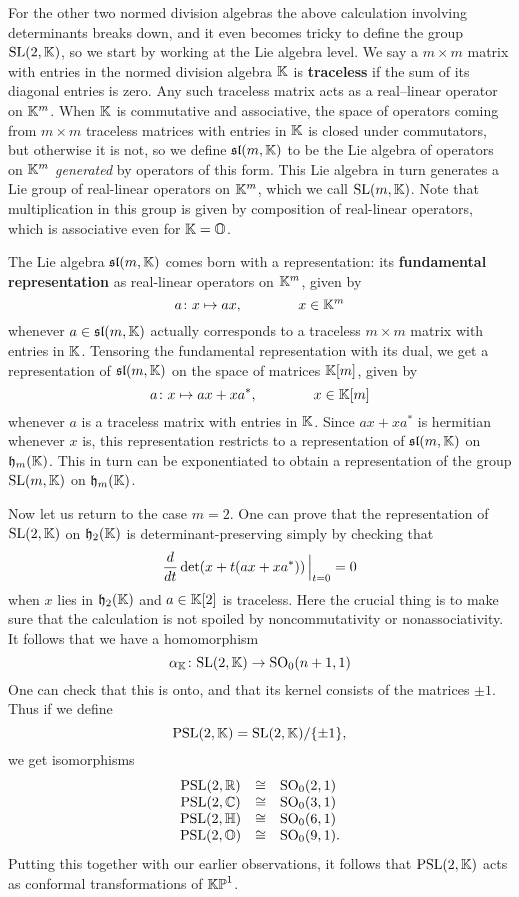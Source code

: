 For the other two normed division algebras the above calculation
involving determinants breaks down, and it even becomes tricky to define
the group ${\rm SL}(2,{\mathbb K})$, so we start by working at the Lie algebra level.
We say a $m \times m$ matrix with entries in the normed division algebra
${\mathbb K}$ is {\bf traceless} if the sum of its diagonal entries is zero.  Any
such traceless matrix acts as a real--linear operator on ${\mathbb K}^m$.  When
${\mathbb K}$ is commutative and associative, the space of operators coming from
$m \times m$ traceless matrices with entries in ${\mathbb K}$ is closed under
commutators, but otherwise it is not, so we define ${\mathfrak {sl}}(m,{\mathbb K})$ to be the
Lie algebra of operators on ${\mathbb K}^m$ {\it generated} by operators of this
form.  This Lie algebra in turn generates a Lie group of real-linear
operators on ${\mathbb K}^m$, which we call ${\rm SL}(m,{\mathbb K})$.  Note that
multiplication in this group is given by composition of real-linear
operators, which is associative even for ${\mathbb K} = {\mathbb O}$.
 
The Lie algebra ${\mathfrak {sl}}(m,{\mathbb K})$ comes born with a representation:  
its {\bf fundamental representation} as real-linear operators on ${\mathbb K}^m$,  
given by 
\[   a \colon x \mapsto ax ,           \qquad \qquad x \in {\mathbb K}^m \] 
whenever $a \in {\mathfrak {sl}}(m,{\mathbb K})$ actually corresponds to a traceless $m \times 
m$ matrix with entries in ${\mathbb K}$.  Tensoring the fundamental representation  
with its dual, we get a representation of ${\mathfrak {sl}}(m,{\mathbb K})$ on the space 
of matrices ${\mathbb K}[m]$, given by 
\[   a \colon x \mapsto ax + xa^*,       \qquad \qquad x \in {\mathbb K}[m]   \] 
whenever $a$ is a traceless matrix with entries in ${\mathbb K}$.  Since $ax + 
xa^*$ is hermitian whenever $x$ is, this representation restricts to a 
representation of ${\mathfrak {sl}}(m,{\mathbb K})$ on ${\mathfrak {h}}_m({\mathbb K})$.   This in turn can be 
exponentiated to obtain a representation of the group ${\rm SL}(m,{\mathbb K})$ on 
${\mathfrak {h}}_m({\mathbb K})$. 
 
Now let us return to the case $m = 2$.  One can prove that the 
representation of ${\rm SL}(2,{\mathbb K})$ on ${\mathfrak {h}}_2({\mathbb K})$ is determinant-preserving 
simply by checking that 
\[    {d \over dt} \det(x + t(ax + xa^*))\, \Bigr|_{t = 0} = 0 \] 
when $x$ lies in ${\mathfrak {h}}_2({\mathbb K})$ and $a \in {\mathbb K}[2]$ is traceless.   Here the 
crucial thing is to make sure that the calculation is not spoiled by 
noncommutativity or nonassociativity.  It follows that we have a  
homomorphism 
\[     \alpha_{\mathbb K} \colon {\rm SL}(2,{\mathbb K}) \to {\rm SO}_0(n+1,1)  \] 
One can check that this is onto, and that its kernel consists of the 
matrices $\pm 1$.  Thus if we define 
\[   {\rm PSL}(2,{\mathbb K}) = {\rm SL}(2,{\mathbb K}) / \{\pm 1\} ,  \] 
we get isomorphisms 
\[     
\begin{array}{ccl}       
          {\rm PSL}(2,{\mathbb R})& \cong &{\rm SO}_0(2,1)   \\ 
          {\rm PSL}(2,{\mathbb C})& \cong &{\rm SO}_0(3,1)   \\   
          {\rm PSL}(2,{\mathbb H})& \cong &{\rm SO}_0(6,1)   \\    
          {\rm PSL}(2,{\mathbb O})& \cong &{\rm SO}_0(9,1) .   
\end{array} 
\] 
Putting this together with our earlier observations, it follows that 
${\rm PSL}(2,{\mathbb K})$ acts as conformal transformations of ${\mathbb {KP}}^1$. 
 
